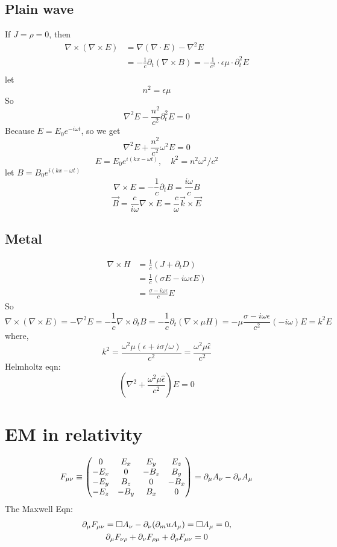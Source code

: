 \subsection{Plain wave}
If $J = \rho = 0$, then
\[
    \begin{aligned}
    \nabla\times(\nabla\times{E}) &= \nabla(\nabla\cdot{E}) - \nabla^{2}E \\
	&=-\frac{1}{c}\partial_{t}(\nabla\times{B})
	=-\frac{1}{c^2}\cdot\epsilon\mu\cdot\partial^2_{t}E \\
    \end{aligned}
    \]
let 
\[ n^2=\epsilon\mu \]
So
\[
    \nabla^2{E}-\frac{n^2}{c^2}\partial^2_{t}E = 0 
    \]
Because $E = E_0e^{-i\omega{t}}$, so we get
\[
    \nabla^2{E}+\frac{n^2}{c^2}\omega^2E = 0 
    \]
\[
    E = E_0e^{i(kx-\omega{t})}, \quad k^2 = n^2\omega^2/c^2
    \]
let $B = B_0e^{i(kx-\omega{t})}$
\[
    \nabla\times{E} = -\frac{1}{c}\partial_{t}B = \frac{i\omega}{c}B
    \]
\[
    \vec{B}=\frac{c}{i\omega}\nabla\times{E}=\frac{c}{\omega}\vec{k}\times{\vec{E}}
    \]

\subsection{Metal}
\[
    \begin{aligned}
    \nabla\times{H}&=\frac{1}{c}(J+\partial_{t}D)   \\
    &=\frac{1}{c}(\sigma{E}-i\omega\epsilon{E})	\\
    &=\frac{\sigma-i\omega\epsilon}{c}E
    \end{aligned}
\]
So 
\[
    \nabla\times(\nabla\times{E})=-\nabla^2{E}=-\frac{1}{c}\nabla\times\partial_{t}B
    =-\frac{1}{c}\partial_{t}(\nabla\times{{\mu}H})
    =-\mu\frac{\sigma-i\omega\epsilon}{c^2}(-i\omega)E
    =k^2E
    \]
where,
\[
    k^2=\frac{\omega^2\mu(\epsilon+i\sigma/\omega)}{c^2}=\frac{\omega^2\mu\hat{\epsilon}}{c^2}
    \]
Helmholtz eqn:
\[
    (\nabla^2+\frac{\omega^2\mu\hat{\epsilon}}{c^2})E=0
    \]



\section{EM in relativity}

\begin{equation}
    F_{\mu\nu} \equiv 
	\begin{pmatrix}
	    0	& E_x	& E_y	& E_z	\\
	    -E_x    & 0	& -B_z	& B_y	\\
	    -E_y    & B_z   & 0	& -B_x	\\
	    -E_z    & -B_y  & B_x   & 0	\\
	\end{pmatrix}
	= \partial_\mu A_\nu - \partial_\nu A_\mu
\end{equation}
The Maxwell Eqn:
\begin{gather}
    \partial_\mu F_{\mu\nu} = \Box A_\nu - \partial_\nu(\partial_mu A_\mu) =
    \Box A_\mu = 0, \notag\\
    \partial_\mu F_{\nu\rho} + \partial_\nu F_{\rho\mu} + \partial_\rho F_{\mu\nu} = 0
\end{gather}
